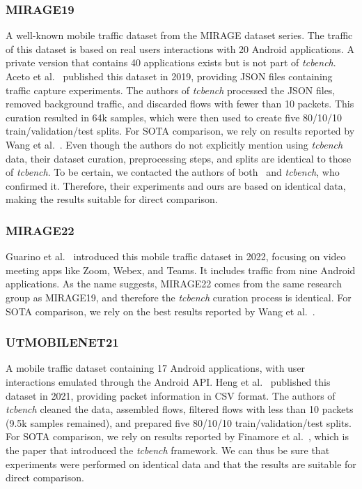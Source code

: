 \documentclass[lettersize,journal,twoside,article]{IEEEtran}
\begin{document}
\subsubsection*{MIRAGE19}
A well-known mobile traffic dataset from the MIRAGE dataset series. The traffic of this dataset is based on real users interactions with 20 Android applications. A private version that contains 40 applications exists but is not part of \textit{tcbench}. Aceto et al.~\cite{dataset_MIRAGE19} published this dataset in 2019, providing JSON files containing traffic capture experiments. The authors of \textit{tcbench} processed the JSON files, removed background traffic, and discarded flows with fewer than 10 packets. This curation resulted in 64k samples, which were then used to create five 80/10/10 train/validation/test splits. For SOTA comparison, we rely on results reported by Wang et al.~\cite{wang2024augmentation}. Even though the authors do not explicitly mention using \textit{tcbench} data, their dataset curation, preprocessing steps, and splits are identical to those of \textit{tcbench}. To be certain, we contacted the authors of both~\cite{wang2024augmentation} and \textit{tcbench}, who confirmed it. Therefore, their experiments and ours are based on identical data, making the results suitable for direct comparison.

\subsubsection*{MIRAGE22}
Guarino et al.~\cite{dataset_MIRAGE22} introduced this mobile traffic dataset in 2022, focusing on video meeting apps like Zoom, Webex, and Teams. It includes traffic from nine Android applications. As the name suggests, MIRAGE22 comes from the same research group as MIRAGE19, and therefore the \textit{tcbench} curation process is identical. For SOTA comparison, we rely on the best results reported by Wang et al.~\cite{wang2024augmentation}.

\subsubsection*{UTMOBILENET21}
A mobile traffic dataset containing 17 Android applications, with user interactions emulated through the Android API. Heng et al.~\cite{dataset_UTMOBILENET21} published this dataset in 2021, providing packet information in CSV format. The authors of \textit{tcbench} cleaned the data, assembled flows, filtered flows with less than 10 packets (9.5k samples remained), and prepared five 80/10/10 train/validation/test splits. For SOTA comparison, we rely on results reported by Finamore et al.~\cite{finamore2023replication}, which is the paper that introduced the \textit{tcbench} framework. We can thus be sure that experiments were performed on identical data and that the results are suitable for direct comparison.
\end{document}
